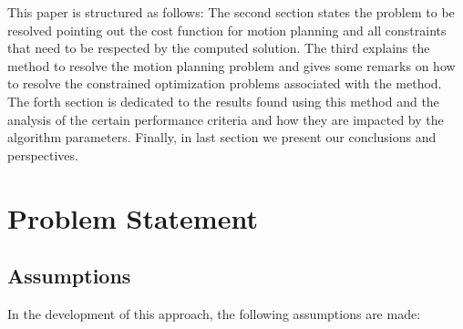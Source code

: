 \documentclass[eprint]{actapoly}
\begin{document}


 


This paper is structured as follows: The second section states the problem to
be resolved pointing out the cost function for motion planning and all constraints
that need to be respected by the computed solution.
The third explains the method to resolve the motion planning problem and gives
some remarks on how to resolve the constrained optimization problems associated
with the method.
The forth section is dedicated to the results found using
this method and the analysis of the certain performance criteria and 
how they are impacted by the algorithm parameters.
Finally, in last section we present our conclusions and perspectives.


\section{Problem Statement}\label{sec:problem}

\subsection{Assumptions}
In the development of this approach, the following assumptions are made:
\end{document}
